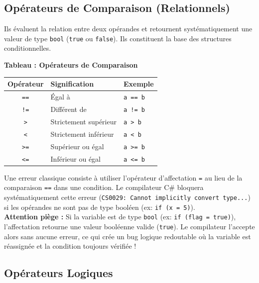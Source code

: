 \subsection{Opérateurs de Comparaison (Relationnels)}

Ils évaluent la relation entre deux opérandes et retournent systématiquement une valeur de type \texttt{bool} (\texttt{true} ou \texttt{false}). Ils constituent la base des structures conditionnelles.

\begin{center}
    \textbf{Tableau : Opérateurs de Comparaison} \\[0.3cm]
    \begin{tabular}{@{}cll@{}}
        \toprule
        \textbf{Opérateur} & \textbf{Signification} & \textbf{Exemple} \\
        \midrule
        \texttt{==} & Égal à & \texttt{a == b} \\
        \texttt{!=} & Différent de & \texttt{a != b} \\
        \texttt{>} & Strictement supérieur & \texttt{a > b} \\
        \texttt{<} & Strictement inférieur & \texttt{a < b} \\
        \texttt{>=} & Supérieur ou égal & \texttt{a >= b} \\
        \texttt{<=} & Inférieur ou égal & \texttt{a <= b} \\
        \bottomrule
    \end{tabular}
\end{center}

\begin{tcolorbox}[colback=backcolour,colframe=keywordcolor,title=\textbf{Erreur Courante : Affectation vs Égalité}]
    Une erreur classique consiste à utiliser l'opérateur d'affectation \texttt{=} au lieu de la comparaison \texttt{==} dans une condition. Le compilateur C\# bloquera systématiquement cette erreur (\texttt{CS0029: Cannot implicitly convert type...}) si les opérandes ne sont pas de type booléen (ex: \texttt{if (x = 5)}). \\
    \textbf{Attention piège :} Si la variable est de type \texttt{bool} (ex: \texttt{if (flag = true)}), l'affectation retourne une valeur booléenne valide (\texttt{true}). Le compilateur l'accepte alors sans aucune erreur, ce qui crée un bug logique redoutable où la variable est réassignée et la condition toujours vérifiée !
\end{tcolorbox}

\subsection{Opérateurs Logiques}

